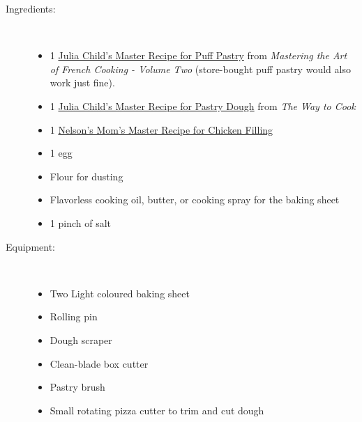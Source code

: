 \documentclass[11pt,letterpaper]{article}
\begin{document}
\begin{description}

\item[Ingredients:]\ \\
        \begin{itemize}
        \item 1 \href{PuffPastry.html}{Julia Child's Master Recipe for Puff Pastry} from {\it Mastering the Art of French Cooking - Volume Two} (store-bought puff pastry would also work just fine).
        \item 1 \href{PastryDough.html}{Julia Child's Master Recipe for Pastry Dough} from {\it The Way to Cook}
        \item 1 \href{ChickenFilling.html}{Nelson's Mom's Master Recipe for Chicken Filling}
        \item 1 egg
        \item Flour for dusting
        \item Flavorless cooking oil, butter, or cooking spray for the baking sheet
        \item 1 pinch of salt
        \end{itemize}

\item[Equipment:]\ \\
        \begin{itemize}
        \item Two Light coloured baking sheet
        \item Rolling pin
        \item Dough scraper
        \item Clean-blade box cutter
        \item Pastry brush
        \item Small rotating pizza cutter to trim and cut dough
        \end{itemize}
        

\end{description}
\end{document}

